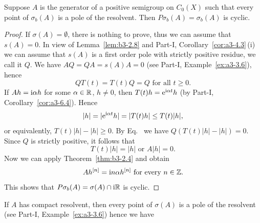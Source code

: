 \begin{theorem}\label{thm:b3-2.9}
Suppose $A$ is the generator of a positive semigroup on $C_{0}(X)$ such that every point of\/ $\sigma_{b}(A)$ is a pole of the resolvent.
Then $P\sigma_{b}(A) = \sigma_{b}(A)$ is cyclic.
\end{theorem}
\begin{proof}
	If\/ $\sigma(A) = \emptyset$, there is nothing to prove, thus we can assume that $s(A) = 0$.
	In view of Lemma~\ref{lem:b3-2.8} and Part-I,  Corollary~\ref{cor:a3-4.3}\,(i) we can assume that $s(A)$ is a first order pole with strictly positive residue, we call it $Q$.
	We have $AQ = QA = s(A)A = 0$ (see Part-I, Example~\ref{ex:a3-3.6}), hence
	\begin{equation}\label{eq:b3-2.18}
		QT(t) = T(t)Q = Q \text{ for all } t \geq 0.
	\end{equation}
	If\/ $Ah = \mathrm{i}\alpha h$ for some $\alpha \in \mathbb{R}$, $h \neq 0$, then $T(t)h = \mathrm{e}^{\mathrm{i}\alpha t}h$ (by Part-I, Corollary~\ref{cor:a3-6.4}).
	Hence 
    \[
    |h| = |\eu^{\im\alpha t}h| = |T(t)h| \leq T(t)|h| , 
    \]
    or equivalently, $T(t)|h| - |h| \geq 0$.
	By Eq.~ we have $Q(T(t)|h| - |h|) = 0$.
	Since $Q$ is strictly positive, it follows that 
    \[
    T(t)|h| = |h| \text{ or } A|h| = 0 .
    \]
	Now we can apply Theorem~\ref{thm:b3-2.4} and obtain 
    \[
    Ah^{[n]} = \mathrm{i} n\alpha h^{[n]} \text{ for every } n \in \mathbb{Z} .
    \]
	This shows that $P\sigma_{b}(A) = \sigma(A) \cap \mathrm{i}\mathbb{R}$ is cyclic.
\end{proof}
If\/ $A$ has compact resolvent, then every point of\/ $\sigma(A)$ is a pole of the resolvent (see Part-I, Example~\ref{ex:a3-3.6}) hence we have

